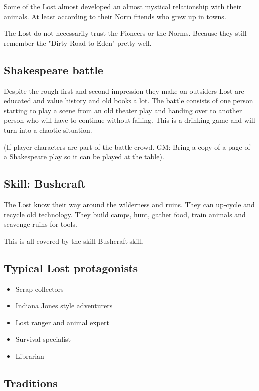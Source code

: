 Some of the Lost almost developed an almost mystical relationship with their animals. At least according to their Norm friends who grew up in towns.

The Lost do not necessarily trust the Pioneers or the Norms. Because they still remember the "Dirty Road to Eden" pretty well.

\subsection{Shakespeare battle}
\label{sec:Shakespeare battle}

Despite the rough first and second impression they make on outsiders Lost are educated and value history and old books a lot. The battle consists of one person starting to play a scene from an old theater play and handing over to another person who will have to continue without failing. This is a drinking game and will turn into a chaotic situation.

(If player characters are part of the battle-crowd. GM: Bring a copy of a page of a Shakespeare play so it can be played at the table).

\subsection{Skill: Bushcraft}
\label{sec:Bushcraft skill}

The Lost know their way around the wilderness and ruins. They can up-cycle and recycle old technology. They build camps, hunt, gather food, train animals and scavenge ruins for tools.

This is all covered by the skill Bushcraft skill.

\subsection{Typical Lost protagonists}

\begin{itemize}
    \item Scrap collectors
    \item Indiana Jones style adventurers
    \item Lost ranger and animal expert
    \item Survival specialist
    \item Librarian
\end{itemize}

\subsection{Traditions}

